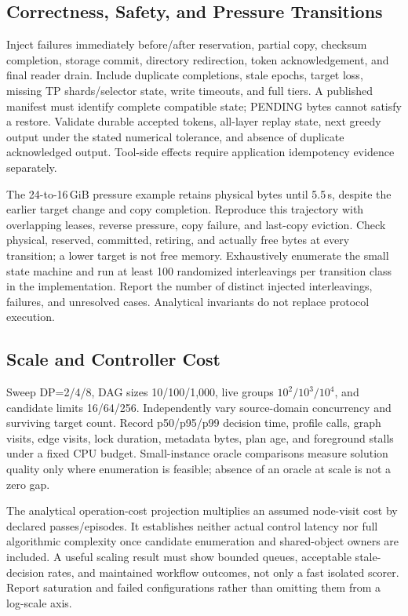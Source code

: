 \documentclass[sigplan,10pt,anonymous,nonacm]{acmart}
\begin{document}
\FloatBarrier
\subsection{Correctness, Safety, and Pressure Transitions}

Inject failures immediately before/after reservation, partial copy,
checksum completion, storage commit, directory redirection, token
acknowledgement, and final reader drain. Include duplicate completions,
stale epochs, target loss, missing TP shards/selector state, write timeouts,
and full tiers. A published manifest must identify complete compatible
state; PENDING bytes cannot satisfy a restore. Validate durable accepted
tokens, all-layer replay state, next greedy output under the stated
numerical tolerance, and absence of duplicate acknowledged output.
Tool-side effects require application idempotency evidence separately.

The 24-to-16\,GiB pressure example retains physical bytes until 5.5\,s,
despite the earlier target change and copy completion. Reproduce this
trajectory with overlapping leases, reverse pressure, copy failure,
and last-copy eviction. Check physical, reserved, committed, retiring,
and actually free bytes at every transition; a lower target is not free
memory. Exhaustively enumerate the small state machine and run at least
100 randomized interleavings per transition class in the implementation.
Report the number of distinct injected interleavings, failures, and
unresolved cases. Analytical invariants do not replace protocol execution.

\FloatBarrier
\subsection{Scale and Controller Cost}

Sweep DP=2/4/8, DAG sizes 10/100/1,000, live groups
$10^2/10^3/10^4$, and candidate limits 16/64/256. Independently vary
source-domain concurrency and surviving target count. Record p50/p95/p99
decision time, profile calls, graph visits, edge visits, lock duration,
metadata bytes, plan age, and foreground stalls under a fixed CPU budget.
Small-instance oracle comparisons measure solution quality only where
enumeration is feasible; absence of an oracle at scale is not a zero gap.

The analytical operation-cost projection multiplies an assumed node-visit cost by declared passes/episodes. It establishes neither actual control latency nor full
algorithmic complexity once candidate enumeration and shared-object
owners are included. A useful scaling result must show bounded queues,
acceptable stale-decision rates, and maintained workflow outcomes, not
only a fast isolated scorer. Report saturation and failed configurations
rather than omitting them from a log-scale axis.
\end{document}

